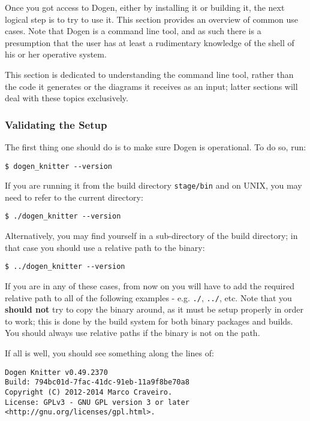 \documentclass[11pt]{article}
\begin{document}
Once you got access to Dogen, either by installing it or building it,
the next logical step is to try to use it. This section provides an
overview of common use cases. Note that Dogen is a command line tool,
and as such there is a presumption that the user has at least a
rudimentary knowledge of the shell of his or her operative system.

This section is dedicated to understanding the command line tool,
rather than the code it generates or the diagrams it receives as an
input; latter sections will deal with these topics exclusively.

\subsubsection{Validating the Setup}
\label{sec-3-2-1}

The first thing one should do is to make sure Dogen is operational. To
do so, run:

\begin{verbatim}
$ dogen_knitter --version
\end{verbatim}

If you are running it from the build directory \texttt{stage/bin} and on
UNIX, you may need to refer to the current directory:

\begin{verbatim}
$ ./dogen_knitter --version
\end{verbatim}

Alternatively, you may find yourself in a sub-directory of the build
directory; in that case you should use a relative path to the binary:

\begin{verbatim}
$ ../dogen_knitter --version
\end{verbatim}

If you are in any of these cases, from now on you will have to add the
required relative path to all of the following examples - e.g. \texttt{./},
\texttt{../}, etc. Note that you \textbf{should not} try to copy the binary around,
as it must be setup properly in order to work; this is done by the
build system for both binary packages and builds. You should always
use relative paths if the binary is not on the path.

If all is well, you should see something along the lines of:

\begin{verbatim}
Dogen Knitter v0.49.2370
Build: 794bc01d-7fac-41dc-91eb-11a9f8be70a8
Copyright (C) 2012-2014 Marco Craveiro.
License: GPLv3 - GNU GPL version 3 or later <http://gnu.org/licenses/gpl.html>.
\end{verbatim}
\end{document}
